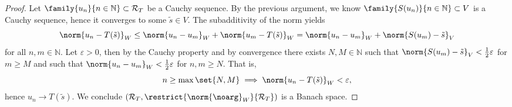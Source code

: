 \begin{proof}
    Let \(\family{u_n}{n\in \mathbb{N}} \subset \range{T}\) be a Cauchy sequence. By the previous argument, we know \(\family{S(u_n)}{n\in \mathbb{N}} \subset V\) is a Cauchy sequence, hence it converges to some \(\tilde{s} \in V\). The subadditivity of the norm yields
    \begin{equation*}
        \norm{u_n - T(\tilde{s})}_W \leq \norm{u_n - u_m}_W + \norm{u_m - T(\tilde{s})}_W = \norm{u_n - u_m}_W + \norm{S(u_m) - \tilde{s}}_V
    \end{equation*}
    for all \(n, m \in \mathbb{N}\). Let \(\varepsilon > 0\), then by the Cauchy property and by convergence there exists \(N, M \in \mathbb{N}\) such that \(\norm{S(u_m) - \tilde{s}}_V < \frac12 \varepsilon\) for \(m \geq M\) and such that \(\norm{u_n - u_m}_W < \frac12 \varepsilon\) for \(n,m \geq N\). That is,
    \begin{equation*}
        n \geq \max\set{N,M} \implies \norm{u_n - T(\tilde{s})}_W < \varepsilon,
    \end{equation*}
    hence \(u_n \to T(\tilde{s})\). We conclude \((\range{T}, \restrict{\norm{\noarg}_W}{\range{T}})\) is a Banach space.
\end{proof}
